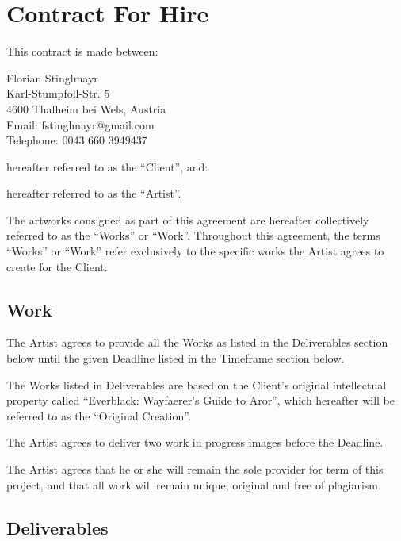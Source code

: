 \documentclass[10pt]{scrartcl}
\begin{document}
\section{Contract For Hire}

This contract is made between:

\begin{mdframed}
  \centering
  Florian Stinglmayr \\
  Karl-Stumpfoll-Str. 5 \\
  4600 Thalheim bei Wels, Austria \\
  Email: fstinglmayr@gmail.com \\
  Telephone: 0043 660 3949437
\end{mdframed}

hereafter referred to as the ``Client'', and:

\begin{center}
  \begin{mdframed}
    \vspace{2.5cm}
  \end{mdframed}
\end{center}

hereafter referred to as the ``Artist''.

The artworks consigned as part of this agreement are hereafter collectively
referred to as the ``Works'' or ``Work''. Throughout this agreement, the terms
``Works'' or ``Work'' refer exclusively to the specific works the Artist
agrees to create for the Client.

\subsection{Work}

The Artist agrees to provide all the Works as listed in the Deliverables
section below until the given Deadline listed in the Timeframe section below.

The Works listed in Deliverables are based on the Client's original
intellectual property called ``Everblack: Wayfaerer's Guide to Aror'', which
hereafter will be referred to as the ``Original Creation''.

The Artist agrees to deliver two work in progress images before the Deadline.

The Artist agrees that he or she will remain the sole provider for term of
this project, and that all work will remain unique, original and free of
plagiarism.

\subsection{Deliverables}
\end{document}
